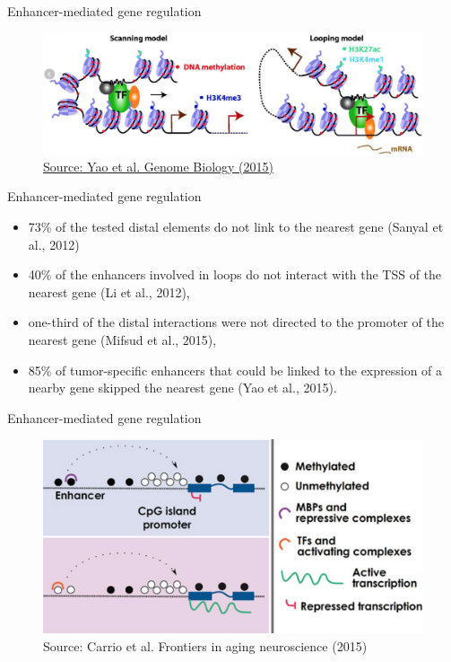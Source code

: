 \documentclass[slidestop,compress,11pt,xcolor=dvipsnames]{beamer}
\begin{document}
\begin{frame}{Enhancer-mediated gene regulation}
 \vspace*{1.0cm}
 \begin{figure}
  \centering
  \includegraphics[width=1.0\linewidth]{ELMER/elmer.png}{\tiny{\\\href{https://genomebiology.biomedcentral.com/articles/10.1186/s13059-015-0668-3}{Source: Yao et al. Genome Biology (2015)}}}
 \end{figure}
\end{frame}



\begin{frame}{Enhancer-mediated gene regulation}
 \begin{itemize}
  \item 73\% of the tested distal elements do not link to the nearest gene (Sanyal et al., 2012)
  \item 40\% of the enhancers involved in loops do not interact with the TSS of the nearest gene (Li et al., 2012),
  \item one-third of the distal interactions were not directed to the promoter of the nearest gene (Mifsud et al., 2015),
  \item 85\% of tumor-specific enhancers that could be linked to the expression of a nearby gene skipped the nearest gene (Yao et al., 2015).
 \end{itemize}
\end{frame}

\begin{frame}{Enhancer-mediated gene regulation}
 \vspace*{-0.1cm}
 \begin{figure}
  \centering
  \includegraphics[width=1.0\linewidth]{ELMER/dna_met.png}{\tiny{\\Source: Carrio et al. Frontiers in aging neuroscience (2015)}}
 \end{figure}
\end{frame}
\end{document}

